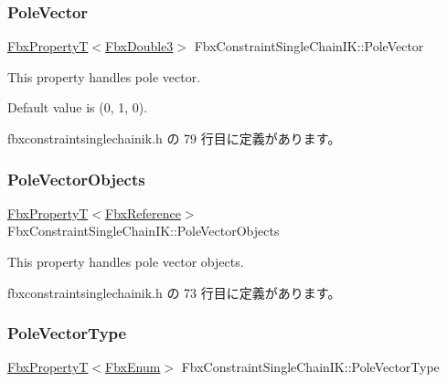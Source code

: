 \subsubsection{\texorpdfstring{Pole\+Vector}{PoleVector}}
{\footnotesize\ttfamily \hyperlink{class_fbx_property_t}{Fbx\+PropertyT}$<$\hyperlink{fbxtypes_8h_ae0a96f14cde566774c7553aa7523b7a7}{Fbx\+Double3}$>$ Fbx\+Constraint\+Single\+Chain\+I\+K\+::\+Pole\+Vector}

This property handles pole vector.

Default value is (0, 1, 0). 

 fbxconstraintsinglechainik.\+h の 79 行目に定義があります。

\mbox{\label{class_fbx_constraint_single_chain_i_k_a20b0f346f5d104fd63a69e3b560cfaba}} 
\subsubsection{\texorpdfstring{Pole\+Vector\+Objects}{PoleVectorObjects}}
{\footnotesize\ttfamily \hyperlink{class_fbx_property_t}{Fbx\+PropertyT}$<$\hyperlink{fbxtypes_8h_a44df6a2eec915cf27cd481e5c5e48a24}{Fbx\+Reference}$>$ Fbx\+Constraint\+Single\+Chain\+I\+K\+::\+Pole\+Vector\+Objects}

This property handles pole vector objects. 

 fbxconstraintsinglechainik.\+h の 73 行目に定義があります。

\mbox{\label{class_fbx_constraint_single_chain_i_k_a5005bf5aa9d33200a228ad9723c519b0}} 
\subsubsection{\texorpdfstring{Pole\+Vector\+Type}{PoleVectorType}}
{\footnotesize\ttfamily \hyperlink{class_fbx_property_t}{Fbx\+PropertyT}$<$\hyperlink{fbxtypes_8h_a9a28614cb4272a0ad7d748eda7f3d3e5}{Fbx\+Enum}$>$ Fbx\+Constraint\+Single\+Chain\+I\+K\+::\+Pole\+Vector\+Type}

